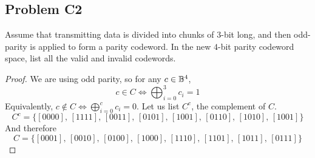 \documentclass[../../../main.tex]{subfiles}
\begin{document}
\subsection{Problem C2}
\begin{wts}
    Assume that transmitting data is divided into chunks of $3$-bit long, and then odd-parity is applied to form a parity codeword. In the new $4$-bit parity codeword space, list all the valid and invalid codewords.
\end{wts}
\begin{proof}
    We are using odd parity, so for any $c\in \mathbb{B}^4$,
    \[
    c\in C\iff \bigoplus_{i=0}^3 c_i =1
    \]
    Equivalently, $c\notin C\iff \bigoplus_{i=0}^c c_i =0$. Let us list $C^c$, the complement of $C$.
    \[
    C^c = \{[0000],\,[1111],\,[0011],\,[0101],\,[1001],\,[0110],\,[1010],\,[1001]\}
    \]
    And therefore
    \[
    C = \{[0001],\,[0010],\,[0100],\,[1000],\,[1110],\,[1101],\,[1011],\,[0111]\}
    \]
\end{proof}
\end{document}
